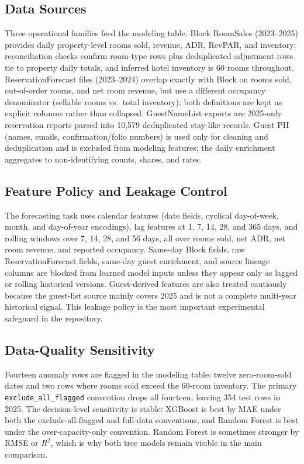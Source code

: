 \documentclass[conference]{IEEEtran}
\begin{document}
\subsection{Data Sources}
Three operational families feed the modeling table. Block RoomSales (2023--2025) provides daily property-level rooms sold, revenue, ADR, RevPAR, and inventory; reconciliation checks confirm room-type rows plus deduplicated adjustment rows tie to property daily totals, and inferred hotel inventory is 60 rooms throughout. ReservationForecast files (2023--2024) overlap exactly with Block on rooms sold, out-of-order rooms, and net room revenue, but use a different occupancy denominator (sellable rooms vs.\ total inventory); both definitions are kept as explicit columns rather than collapsed. GuestNameList exports are 2025-only reservation reports parsed into 10,579 deduplicated stay-like records. Guest PII (names, emails, confirmation/folio numbers) is used only for cleaning and deduplication and is excluded from modeling features; the daily enrichment aggregates to non-identifying counts, shares, and rates.

\subsection{Feature Policy and Leakage Control}
The forecasting task uses calendar features (date fields, cyclical day-of-week, month, and day-of-year encodings), lag features at 1, 7, 14, 28, and 365 days, and rolling windows over 7, 14, 28, and 56 days, all over rooms sold, net ADR, net room revenue, and reported occupancy. Same-day Block fields, raw ReservationForecast fields, same-day guest enrichment, and source lineage columns are blocked from learned model inputs unless they appear only as lagged or rolling historical versions. Guest-derived features are also treated cautiously because the guest-list source mainly covers 2025 and is not a complete multi-year historical signal. This leakage policy is the most important experimental safeguard in the repository.

\subsection{Data-Quality Sensitivity}
Fourteen anomaly rows are flagged in the modeling table: twelve zero-room-sold dates and two rows where rooms sold exceed the 60-room inventory. The primary \texttt{exclude\_all\_flagged} convention drops all fourteen, leaving 354 test rows in 2025. The decision-level sensitivity is stable: XGBoost is best by MAE under both the exclude-all-flagged and full-data conventions, and Random Forest is best under the over-capacity-only convention. Random Forest is sometimes stronger by RMSE or $R^2$, which is why both tree models remain visible in the main comparison.
\end{document}
